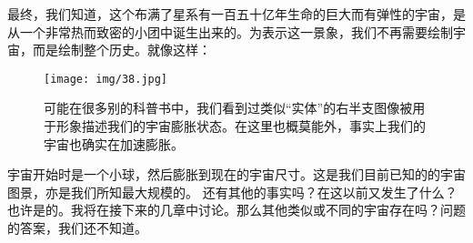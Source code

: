     最终，我们知道，这个布满了星系有一百五十亿年生命的巨大而有弹性的宇宙，是从一个非常热而致密的小团中诞生出来的。为表示这一景象，我们不再需要绘制宇宙，而是绘制整个历史。就像这样：
\begin{figure}[htbp]
\begin{minipage}[t]{0.3\linewidth}
\centering
\bc
\texttt{[image: img/38.jpg]}\\[12pt]
\ec
\caption{可能在很多别的科普书中，我们看到过类似“实体”的右半支图像被用于形象描述我们的宇宙膨胀状态。在这里也概莫能外，事实上我们的宇宙也确实在加速膨胀。}
\label{fig:side:a}
\end{minipage}

\end{figure}  

    宇宙开始时是一个小球，然后膨胀到现在的宇宙尺寸。这是我们目前已知的的宇宙图景，亦是我们所知最大规模的。
    还有其他的事实吗？在这以前又发生了什么？也许是的。我将在接下来的几章中讨论。那么其他类似或不同的宇宙存在吗？问题的答案，我们还不知道。




 

\noindent

